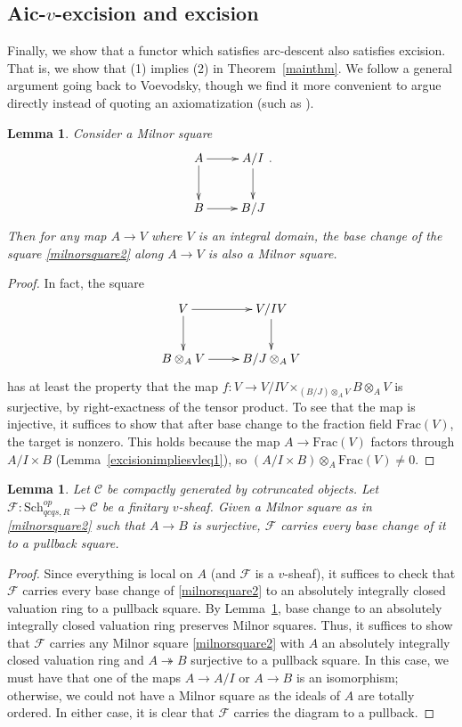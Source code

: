 \documentclass[reqno]{amsart}
\newtheorem{lemma}[theorem]{Lemma}
\theoremstyle{definition}
\begin{document}
\subsection{Aic-$v$-excision and excision}
\label{excgeneral}
Finally, we show that a functor which satisfies arc-descent also satisfies excision.  That is, we show that (1) implies (2) in Theorem~\ref{mainthm}.
We follow a general argument going back to Voevodsky, though we find it more
convenient to argue directly instead of quoting an axiomatization (such as
\cite[Th.~3.2.5]{AHW}).



\begin{lemma} 
\label{milnorbase}
Consider a Milnor square 
\begin{equation} 
\xymatrix{
A \ar[d]  \ar[r] & A/I \ar[d]  \\
B \ar[r] &  B/J
}. \label{milnorsquare2}
\end{equation} 
Then for any map $A \to
V$ where $V$ is an integral domain, the base change of the square
\eqref{milnorsquare2} along
$A \to V$ is also a Milnor square. 
\end{lemma} 
\begin{proof} 
In fact, the square
\[ \xymatrix{
V \ar[d]  \ar[r] &  V/IV \ar[d]  \\
B \otimes_A V \ar[r] &  B/J \otimes_A V
}\]
has at least the property that the map 
$f\colon  V \to V/IV \times_{(B /J) \otimes_A V} B \otimes_A V $ is surjective, by
right-exactness of the tensor product. 
To see that the map is injective, it suffices to show that 
after base change to the fraction field $\mathrm{Frac}(V)$, the target is
nonzero. This holds because the map $A  \to \mathrm{Frac}(V)$ factors through
$A/I \times B$
(Lemma~\ref{excisionimpliesvleq1}), so $(A/I \times B) \otimes_A \mathrm{Frac}(V) \neq 0$. 
\end{proof} 


\begin{lemma} 
\label{surjmilnorsquare}
Let $\mathcal{C}$ be compactly generated by cotruncated objects. 
Let $\mathcal{F}\colon  \mathrm{Sch}_{qcqs,R}^{op} \to \mathcal{C}$ be a finitary  $v$-sheaf.
Given a Milnor square as in \eqref{milnorsquare2} such that 
$A \to B$ is surjective, $\mathcal{F}$ carries every base change of it to a  pullback square. 
\end{lemma}
\begin{proof} 
Since everything is local on $A$ (and $\mathcal{F}$ is a $v$-sheaf),
it suffices to check that $\mathcal{F}$ carries every base change of
\eqref{milnorsquare2} to an absolutely integrally closed valuation ring to a
pullback square. By Lemma~\ref{milnorbase},
base change to an absolutely integrally closed valuation ring preserves Milnor squares. 
Thus, it suffices to show that $\mathcal{F}$ carries any Milnor square
\eqref{milnorsquare2}
with $A$ an absolutely integrally closed valuation ring and $A
\twoheadrightarrow B$ surjective to a 
pullback square. 
In this case, 
we must have that one of the maps $A \to A/I$ or $A \to B$ is an isomorphism;
otherwise, we could not have a Milnor square as the ideals of $A$ are totally
ordered. In either case, it is clear that $\mathcal{F}$ carries the diagram to a 
pullback. 
 \end{proof} 
\end{document}
